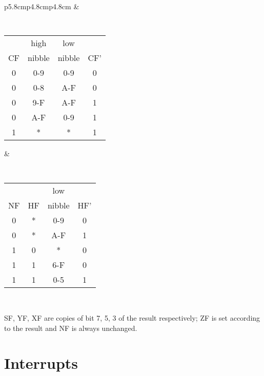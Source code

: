 \documentclass[12pt,twoside,openright,a4paper]{book}
\begin{document}
{\begin{tabular}{p{5.8cm}p{4.8cm}p{4.8cm}}
		&

		{\tt
			\begin{tabular}[t]{c|c|c|c}
				   & high   & low    & \\
				CF & nibble & nibble & CF' \\ 	
				\hline
				0 & 0-9    & 0-9    &  0  \\
				0 & 0-8    & A-F    &  0  \\
				0 & 9-F    & A-F    &  1  \\
				0 & A-F    & 0-9    &  1  \\
				1 &  *     &  *     &  1  \\ 
				\hline
			\end{tabular}
		}

		&
		
		{\tt
			\begin{tabular}[t]{c|c|c|c}
				   &    & low    & \\
				NF & HF & nibble & HF' \\ 
				\hline
				0 &  * & 0-9    &  0  \\
				0 &  * & A-F    &  1  \\
				1 &  0 &  *     &  0  \\
				1 &  1 & 6-F    &  0  \\
				1 &  1 & 0-5    &  1  \\ 
				\hline
			\end{tabular}
		}
		
		\\

	\end{tabular}
}

SF, YF, XF are copies of bit 7, 5, 3 of the result respectively; ZF is set according to the result and NF is always unchanged.


\pagebreak
\section{Interrupts}
\label{interrupts}
\end{document}
